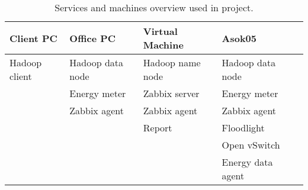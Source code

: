 \begin{table}[b]
	\centering
	\caption{Services and machines overview used in project. }
	\begin{tabular}{|l|l|l|l|l|}
		\hline \rule[-2ex]{0pt}{5.5ex} \textbf{Client PC} & \textbf{Office PC} & \textbf{Virtual Machine} & \textbf{Asok05} \\ 
		\hline \rule[-2ex]{0pt}{5.5ex} Hadoop client & Hadoop data node & Hadoop name node & Hadoop data node \\ 
		       \rule[-2ex]{0pt}{5.5ex}  & Energy meter & Zabbix server & Energy meter \\ 
		       \rule[-2ex]{0pt}{5.5ex}  & Zabbix agent & Zabbix agent & Zabbix agent \\ 
		       \rule[-2ex]{0pt}{5.5ex}  &  & Report & Floodlight \\ 
		       \rule[-2ex]{0pt}{5.5ex}  &  &  & Open vSwitch \\ 
		       \rule[-2ex]{0pt}{5.5ex}  &  &  & Energy data agent \\ 
		\hline 
	\end{tabular}
	\label{tab:services}
\end{table}

